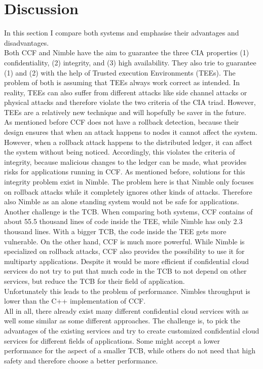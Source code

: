 \section{Discussion}
\label{challenges:ccf}
In this section I compare both systems and emphasise their advantages and disadvantages.\\
Both CCF and Nimble have the aim to guarantee the three CIA properties (1) confidentiality, (2) integrity, and (3) high availability. They also trie to guarantee (1) and (2) with the help of Trusted execution Environments (TEEs). The problem of both is assuming that TEEs always work correct as intended. In reality, TEEs can also suffer from different attacks like side channel attacks or physical attacks and therefore violate the two criteria of the CIA triad. However, TEEs are a relatively new technique and will hopefully be saver in the future.\\
As mentioned before CCF does not have a rollback detection, because their design ensures that when an attack happens to nodes it cannot affect the system. However, when a rollback attack happens to the distributed ledger, it can affect the system without being noticed. Accordingly, this violates the criteria of integrity, because malicious changes to the ledger can be made, what provides risks for applications running in CCF.
As mentioned before, solutions for this integrity problem exist in Nimble. The problem here is that Nimble only focuses on rollback attacks while it completely ignores other kinds of attacks. Therefore also Nimble as an alone standing system would not be safe for applications.\\
Another challenge is the TCB. When comparing both systems, CCF contains of about 55.5 thousand lines of code inside the TEE, while Nimble has only 2.3 thousand lines. With a bigger TCB, the code inside the TEE gets more vulnerable. On the other hand, CCF is much more powerful. While Nimble is specialized on rollback attacks, CCF also provides the possibility to use it for multiparty applications.  Despite it would be more efficient if confidential cloud services do not try to put that much code in the TCB to not depend on other services, but reduce the TCB for their field of application.\\
 Unfortunately this leads to the problem of performance. Nimbles throughput is lower than the C++ implementation of CCF. \\
All in all, there already exist many different confidential cloud services with as well some similar as some different approaches. The challenge is, to pick the advantages of the existing services and try to create customized confidential cloud services for different fields of applications. Some might accept a lower performance for the aspect of a smaller TCB, while others do not need that high safety and therefore choose a better performance.  